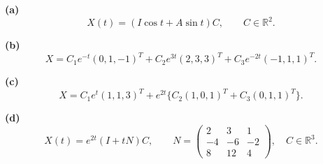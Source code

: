 \noindent\textbf{(a)} \[X(t)=(I\cos t+A\sin t)C,\qquad C\in\mathbb R^2.\]

\noindent\textbf{(b)} \[X=C_1e^{-t}(0,1,-1)^T+C_2e^{3t}(2,3,3)^T+C_3e^{-2t}(-1,1,1)^T.\]

\noindent\textbf{(c)} \[X=C_1e^t(1,1,3)^T+e^{2t}\{C_2(1,0,1)^T+C_3(0,1,1)^T\}.\]

\noindent\textbf{(d)} \[X(t)=e^{2t}(I+tN)C,\qquad N=\begin{pmatrix}2&3&1\\-4&-6&-2\\8&12&4\end{pmatrix},\quad C\in\mathbb R^3.\]
